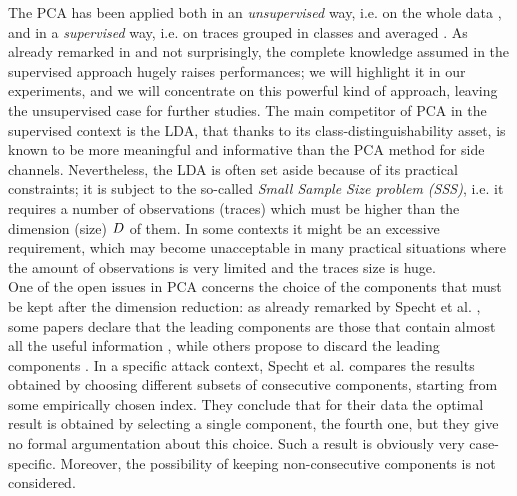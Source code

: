  The PCA has been applied both in an {\em unsupervised} way, i.e. on the whole data \cite{Batina2012,karsmakers2009side}, and in a {\em supervised} way, i.e. on traces grouped in classes and averaged \cite{TAprincipal,choudaryefficient,choudary2014efficient,disassembler,Standaert2008}. As already remarked in \cite{disassembler} and not surprisingly, the complete knowledge assumed in the supervised approach hugely raises performances; we will highlight it in our experiments, and we will concentrate on this powerful kind of approach, leaving the unsupervised case for further studies. The main competitor of PCA in the supervised context is the LDA, that thanks to its class-distinguishability asset, is known to be more meaningful and informative \cite{lessIsMore,Standaert2008} than the PCA method  for side channels. Nevertheless, the LDA is often set aside because of its practical constraints; it is subject to the so-called {\em Small Sample Size problem (SSS)}, i.e. it requires a number of observations (traces) which must be higher than the dimension (size) $D$ of them. In some contexts it might be an excessive requirement, which may become unacceptable in many practical situations where the amount of observations is very limited and the traces size is huge.\\

 One of the open issues in PCA concerns the choice of the components that must be kept after the dimension reduction: as already remarked by Specht et al.  \cite{specht}, some papers declare that the leading components are those that contain almost all the useful information \cite{TAprincipal,choudary2014efficient}, while others propose to discard the leading components \cite{Batina2012}. In a specific attack context, Specht et al. compares the results obtained by choosing different subsets of consecutive components, starting from some empirically chosen index. They conclude that for their data the optimal result is obtained by selecting a single component, the fourth one, but they give no formal argumentation about this choice. Such a result is obviously very case-specific. Moreover, the possibility of keeping non-consecutive components is not considered. \\
 
